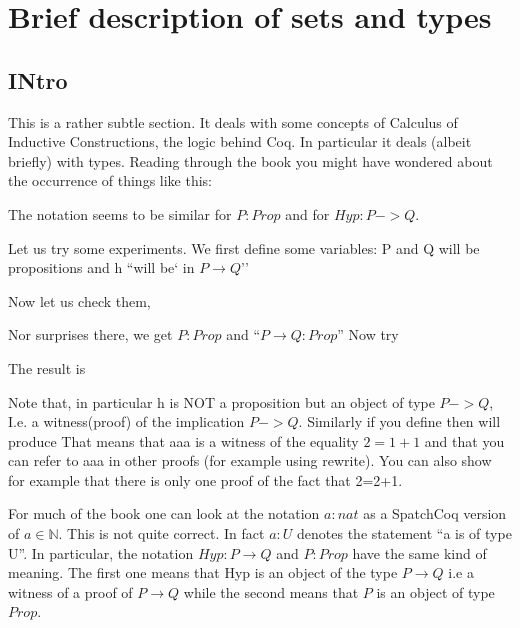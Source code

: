 \chapter{Brief description of sets and  types}\label{chap:setsvstypes}
\cite{Nederpelt:2014aa}
\cite{Girard:1989aa}
\section{INtro}\label{sec:types}

This is a rather subtle section. It deals with some concepts of Calculus of Inductive Constructions, the logic behind Coq. In particular it deals (albeit briefly) with types. Reading through the book you might have wondered about the occurrence of things like this:


The notation seems to be similar for $P:Prop$ and for $Hyp:P->Q$.

Let us try some experiments. We first define some variables: P and Q will be propositions and h ``will be` in $P\rightarrow Q$''


Now let us check them, 

Nor surprises there, we get $P:Prop$ and ``$P \rightarrow Q : Prop$''
Now try

The result is 
     
Note that, in particular h is NOT a proposition but an object of type $P->Q$, I.e. a witness(proof) of the implication $P->Q$. Similarly if you define 
then  will produce
That means that aaa is a witness of the equality $2=1+1$ and that you can refer to aaa in other proofs (for example using rewrite). You can also show for example that there is only one proof of the fact that 2=2+1.




 For much of the book one can look at the notation $a:nat$ as a SpatchCoq version of $a\in \mathbb{N}$. This is not quite correct. In fact $a:U$ denotes the statement ``a is of type U''. In particular, the notation $Hyp:P\rightarrow Q$ and $P:Prop$ have the same kind of meaning. The first one means that Hyp is an object of the type $P\rightarrow Q$ i.e a witness of a proof of $P\rightarrow Q$ while the second means that $P$ is an object of type $Prop$.

